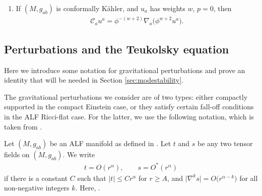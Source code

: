 \documentclass[10pt,a4paper]{amsart}
\numberwithin{equation}{section}
\begin{document}
\begin{Remark}
\begin{enumerate}
$(M,g_{ab})$ is conformally K\"ahler iff it is Hermitian and $f_{a}=\nabla_{a}\log\phi$ for some scalar field $\phi$ (with $w=-1$, $p=0$). This field satisfies
\begin{align*}
\mathcal{C}_{a}\phi=0.
\end{align*}
For example, in the Einstein--Hermitian case we have that
\cite[Remark 5.1]{araneda2021conformal}
\begin{align} \label{phiEinstein}
\phi \propto \Psi^{1/3}_{2}.
\end{align}
\item
If $(M,g_{ab})$ is conformally K\"ahler, and $u_{a}$ has weights $w$, $p=0$, then
\begin{align} \label{identity}
\mathcal{C}_{a}u^{a} = \phi^{-(w+2)}\nabla_{a}\bigl(\phi^{w+2}u^{a}\bigr).
\end{align}
\end{enumerate}
\end{Remark}



\subsection{Perturbations and the Teukolsky equation}
\label{sec:perturbations}

Here we introduce some notation for gravitational perturbations and prove an identity that will be needed in Section \ref{sec:modestability}.

The gravitational perturbations we consider are of two types: either compactly supported in the compact Einstein case, or they satisfy certain fall-off conditions in the ALF Ricci-flat case. For the latter, we use the following notation, which is taken from \cite{2023arXiv230614567A}.
\begin{Definition}\label{def:Onotation}
Let $(M,g_{ab})$ be an ALF manifold as defined in \cite[Definition~2.1]{2023arXiv230614567A}. Let $t$ and $s$ be any two tensor fields on $(M,g_{ab})$. We write
\begin{align*}%
 t = O(r^{\alpha}), \qquad s = O^{*}(r^{\alpha})
\end{align*}
if there is a constant $C$ such that $|t|\leq C r^{\alpha}$ for $r\geq A$, and $\bigl|\nabla^{k}s\bigr|=O\bigl(r^{\alpha-k}\bigr)$ for all non-negative integers $k$. Here, .
\end{Definition}
\end{document}
